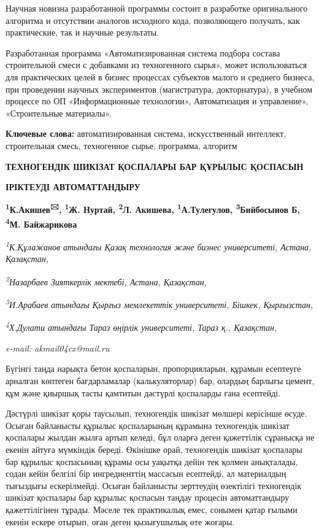 \documentclass[
]{article}
\begin{document}
Научная новизна разработанной программы состоит в разработке
оригинального алгоритма и отсутствии аналогов исходного кода,
позволяющего получать, как практические, так и научные результаты.

Разработанная программа «Автоматизированная система подбора состава
строительной смеси с добавками из техногенного сырья», может
использоваться для практических целей в бизнес процессах субъектов
малого и среднего бизнеса, при проведении научных экспериментов
(магистратура, докторнатура), в учебном процессе по ОП «Информационные
технологии», Автоматизация и управление», «Строительные материалы».

\textbf{Ключевые слова:} автоматизированная система, искусственный
интеллект, строительная смесь, техногенное сырье, программа, алгоритм

\textbf{ТЕХНОГЕНДІК ШИКІЗАТ ҚОСПАЛАРЫ БАР ҚҰРЫЛЫС ҚОСПАСЫН}

\textbf{ІРІКТЕУДІ АВТОМАТТАНДЫРУ}

\textbf{\textsuperscript{1}К.Акишев\textsuperscript{🖂},
\textsuperscript{1}Ж. Нуртай, \textsuperscript{2}Л. Акишева,
\textsuperscript{1}А.Тулегулов, \textsuperscript{3}Бийбосынов Б,
\textsuperscript{4}М. Байжарикова}

\emph{\textsuperscript{1}К.Құлажанов атындағы Қазақ технология және
бизнес университеті, Астана, Қазақстан,}

\emph{\textsuperscript{2}Назарбаев Зияткерлік мектебі, Астана,
Қазақстан,}

\emph{\textsuperscript{3}И.Арабаев атындағы Қырғыз мемлекеттік
университеті, Бішкек, Қырғызстан,}

\emph{\textsuperscript{4}Х.Дулати атындағы Тараз өңірлік университеті,
Тараз қ., Қазақстан,}

\emph{e-mail: akmail04cx@mail.ru}

Бүгінгі таңда нарықта бетон қоспаларын, пропорцияларын, құрамын
есептеуге арналған көптеген бағдарламалар (калькуляторлар) бар, олардың
барлығы цемент, құм және қиыршық тасты қамтитын дәстүрлі қоспаларды ғана
есептейді.

Дәстүрлі шикізат қоры таусылып, техногендік шикізат мөлшері керісінше
өсуде. Осыған байланысты құрылыс қоспаларының құрамына техногендік
шикізат қоспалары жылдан жылға артып келеді, бұл оларға деген қажеттілік
сұранысқа ие екенін айтуға мүмкіндік береді. Өкінішке орай, техногендік
шикізат қоспалары бар құрылыс қоспасының құрамы осы уақытқа дейін тек
қолмен анықталады, содан кейін белгілі бір ингредиенттің массасын
есептейді, ал материалдың тығыздығы ескерілмейді. Осыған байланысты
зерттеудің өзектілігі техногендік шикізат қоспалары бар құрылыс қоспасын
таңдау процесін автоматтандыру қажеттілігінен тұрады. Мәселе тек
практикалық емес, сонымен қатар ғылыми екенін ескере отырып, оған деген
қызығушылық өте жоғары.
\end{document}
